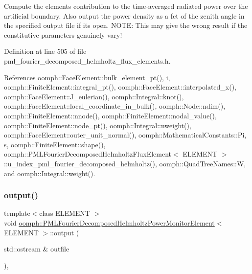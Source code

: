 Compute the element\textquotesingle{}s contribution to the time-\/averaged radiated power over the artificial boundary. Also output the power density as a fct of the zenith angle in the specified output file if it\textquotesingle{}s open. N\+O\+TE\+: This may give the wrong result if the constitutive parameters genuinely vary! 



Definition at line 505 of file pml\+\_\+fourier\+\_\+decomposed\+\_\+helmholtz\+\_\+flux\+\_\+elements.\+h.



References oomph\+::\+Face\+Element\+::bulk\+\_\+element\+\_\+pt(), i, oomph\+::\+Finite\+Element\+::integral\+\_\+pt(), oomph\+::\+Face\+Element\+::interpolated\+\_\+x(), oomph\+::\+Face\+Element\+::\+J\+\_\+eulerian(), oomph\+::\+Integral\+::knot(), oomph\+::\+Face\+Element\+::local\+\_\+coordinate\+\_\+in\+\_\+bulk(), oomph\+::\+Node\+::ndim(), oomph\+::\+Finite\+Element\+::nnode(), oomph\+::\+Finite\+Element\+::nodal\+\_\+value(), oomph\+::\+Finite\+Element\+::node\+\_\+pt(), oomph\+::\+Integral\+::nweight(), oomph\+::\+Face\+Element\+::outer\+\_\+unit\+\_\+normal(), oomph\+::\+Mathematical\+Constants\+::\+Pi, s, oomph\+::\+Finite\+Element\+::shape(), oomph\+::\+P\+M\+L\+Fourier\+Decomposed\+Helmholtz\+Flux\+Element$<$ E\+L\+E\+M\+E\+N\+T $>$\+::u\+\_\+index\+\_\+pml\+\_\+fourier\+\_\+decomposed\+\_\+helmholtz(), oomph\+::\+Quad\+Tree\+Names\+::W, and oomph\+::\+Integral\+::weight().

\mbox{\label{classoomph_1_1PMLFourierDecomposedHelmholtzPowerMonitorElement_ab8ef8d59a746a0920304ef97edd1bc34}} 
\subsubsection{\texorpdfstring{output()}{output()}\hspace{0.1cm}{\footnotesize\ttfamily [1/4]}}
{\footnotesize\ttfamily template$<$class E\+L\+E\+M\+E\+NT $>$ \\
void \hyperlink{classoomph_1_1PMLFourierDecomposedHelmholtzPowerMonitorElement}{oomph\+::\+P\+M\+L\+Fourier\+Decomposed\+Helmholtz\+Power\+Monitor\+Element}$<$ E\+L\+E\+M\+E\+NT $>$\+::output (\begin{DoxyParamCaption}\item[{std\+::ostream \&}]{outfile }\end{DoxyParamCaption})\hspace{0.3cm}{\ttfamily [inline]}, {\ttfamily [virtual]}}

